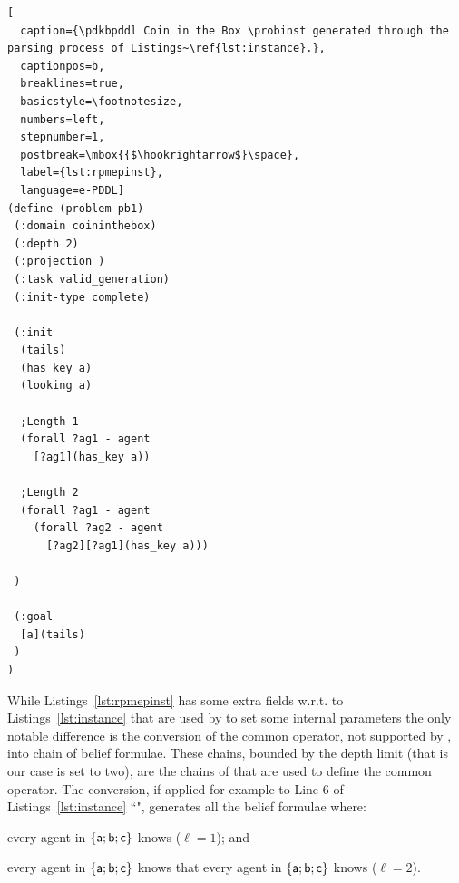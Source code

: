 \begin{lstlisting}[
  caption={\pdkbpddl Coin in the Box \probinst generated through the parsing process of Listings~\ref{lst:instance}.},
  captionpos=b,
  breaklines=true,
  basicstyle=\footnotesize,
  numbers=left,
  stepnumber=1,
  postbreak=\mbox{{$\hookrightarrow$}\space},
  label={lst:rpmepinst},
  language=e-PDDL]
(define (problem pb1)
 (:domain coininthebox)
 (:depth 2)
 (:projection )
 (:task valid_generation)
 (:init-type complete)
 
 (:init
  (tails)
  (has_key a)
  (looking a)

  ;Length 1
  (forall ?ag1 - agent
	[?ag1](has_key a))

  ;Length 2
  (forall ?ag1 - agent
    (forall ?ag2 - agent
      [?ag2][?ag1](has_key a)))

 )

 (:goal 
  [a](tails)
 )
)
\end{lstlisting}
While Listings~\ref{lst:rpmepinst} has some extra fields w.r.t. to Listings~\ref{lst:instance} that are used by \rpmep to set some internal parameters the only notable difference is the conversion of the common \knobel operator, not supported by \rpmep, into chain of belief formulae.
These chains, bounded by the depth limit (that is our case is set to two), are the chains of \knobel that are used to define the common \knobel operator.
The conversion, if applied for example to Line 6 of Listings~\ref{lst:instance} ``", generates all the belief formulae where:
    \begin{enumerate*}[label= ]
        \item every agent in $\{\mathsf{a};\mathsf{b};\mathsf{c}\}$ knows  ($\ell = 1$); and
        \item every agent in  $\{\mathsf{a};\mathsf{b};\mathsf{c}\}$ knows that every agent in  $\{\mathsf{a};\mathsf{b};\mathsf{c}\}$ knows  ($\ell = 2$).
    \end{enumerate*}
    
